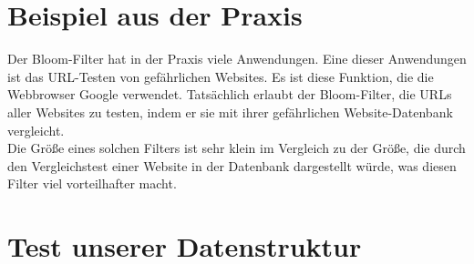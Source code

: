 \documentclass[12pt, letterpaper]{article}
\begin{document}
\section{Beispiel aus der Praxis}

Der Bloom-Filter hat in der Praxis viele Anwendungen. Eine dieser Anwendungen ist das URL-Testen von gefährlichen Websites. Es ist diese Funktion, die die Webbrowser Google verwendet. Tatsächlich erlaubt der Bloom-Filter, die URLs aller Websites zu testen, indem er sie mit ihrer gefährlichen Website-Datenbank vergleicht.\\
Die Größe eines solchen Filters ist sehr klein im Vergleich zu der Größe, die durch den Vergleichstest einer Website in der Datenbank dargestellt würde, was diesen Filter viel vorteilhafter macht.

\section{Test unserer Datenstruktur}
\end{document}
